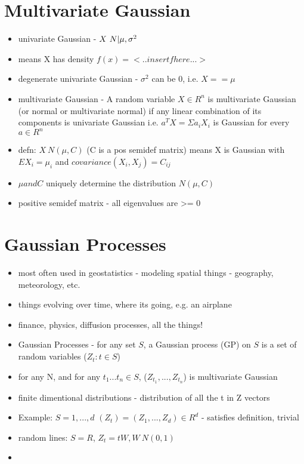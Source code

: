 \documentclass[12pt]{article}
\begin{document}
\section{Multivariate Gaussian}
\begin{itemize}
    \item univariate Gaussian - $X\\~N|\mu,\sigma^{2}$
    \item means X has density $f(x) = <..insert f here...>$
    \item degenerate univariate Gaussian - $\sigma^{2}$ can be 0, i.e. $X == \mu$
    \item multivariate Gaussian - A random variable $X \in R^{n}$ is multivariate Gaussian (or normal or multivariate normal) if any linear combination of its components is univariate Gaussian i.e. $a^{T}X = \Sigma a_{i}X_{i}$ is Gaussian for every $a \in R^{n}$
    \item defn: $X~N(\mu, C)$ (C is a pos semidef matrix) means X is Gaussian with $EX_{i}=\mu_{i}$ and $covariance(X_{i},X_{j}) = C_{ij}$
    \item $\mu and C$ uniquely determine the distribution $N(\mu, C)$
    \item positive semidef matrix - all eigenvalues are >= 0
\end{itemize}

\section{Gaussian Processes}
\begin{itemize}
    \item most often used in geostatistics - modeling spatial things - geography, meteorology, etc.
    \item things evolving over time, where its going, e.g. an airplane
    \item finance, physics, diffusion processes, all the things!
    \item Gaussian Processes - for any set $S$, a Gaussian process (GP) on $S$ is a set of random variables ($Z_{t} : t\in S$)
    \item for any N, and for any $t_{1}...t_{n}\in S$, ($Z_{t_{1}},...,Z_{t_{n}}$) is multivariate Gaussian
    \item finite dimentional distributions - distribution of all the t in Z vectors
    \item Example: $S = {1,...,d}$      $(Z_{t}) = (Z_{1},...,Z_{d}) \in R^{d}$ - satisfies definition, trivial
    \item random lines: $S=R$, $Z_{t} = tW, W~N(0,1)$
    \item 
\end{itemize}
\end{document}
